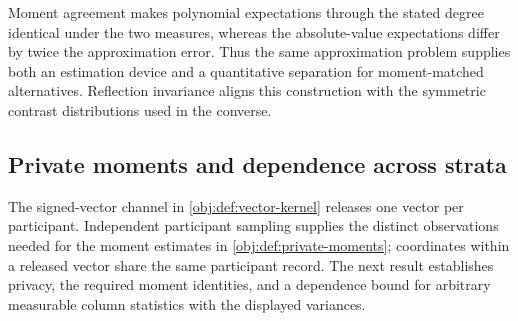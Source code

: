 Moment agreement makes polynomial expectations through the stated degree identical under the two measures, whereas the absolute-value expectations differ by twice the approximation error. Thus the same approximation problem supplies both an estimation device and a quantitative separation for moment-matched alternatives. Reflection invariance aligns this construction with the symmetric contrast distributions used in the converse.

\subsection{Private moments and dependence across strata}

The signed-vector channel  in \cref{obj:def:vector-kernel} releases one vector per participant. Independent participant sampling supplies the distinct observations needed for the moment estimates in \cref{obj:def:private-moments}; coordinates within a released vector share the same participant record. The next result establishes privacy, the required moment identities, and a dependence bound for arbitrary measurable column statistics with the displayed variances.

